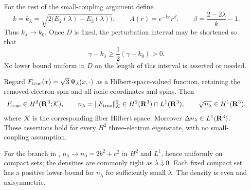 For the rest of the small-coupling argument define
\begin{equation}
 k=k_\lambda=\sqrt{2\bigl(E_2(\lambda)-E_3(\lambda)\bigr)},\qquad
 A(r)=e^{-kr}r^\beta,\qquad
 \beta=\frac{2-2\lambda}{k}-1 .
 \label{eq:ionization-parameters}
\end{equation}
Thus \(k_\lambda\to k_0\).  Once \(D\) is fixed, the perturbation
interval may be shortened so that
\begin{equation}
 \gamma-k_\lambda\ge\frac12(\gamma-k_0)>0 .
 \label{eq:uniform-fast-slow-separation}
\end{equation}
No lower bound uniform in \(D\) on the length of this interval is
asserted or needed.

\begin{lemma}
\label{lem:density-regularity}
Regard
\(F_{\rm true}(x)=\sqrt3\,\Psi_\lambda(x,\cdot)\) as a
Hilbert-space-valued function, retaining the removed-electron spin
and all ionic coordinates and spins.  Then
\[
 F_{\rm true}\in H^2(\mathbf R^3;\mathcal K),\qquad
 n_\lambda=\|F_{\rm true}\|_{\mathcal K}^2
       \in H^2(\mathbf R^3)\cap L^1(\mathbf R^3),\qquad
 \sqrt{n_\lambda}\in H^1(\mathbf R^3),
\]
where \(\mathcal K\) is the corresponding fiber Hilbert space.
Moreover \(\Delta n_\lambda\in L^1(\mathbf R^3)\).
These assertions hold for every \(H^2\) three-electron eigenstate,
with no small-coupling assumption.

For the branch in ,
\(n_\lambda\to n_0=2b^2+e^2\) in \(H^2\) and \(L^1\), hence
uniformly on compact sets; the densities are commonly tight as
\(\lambda\downarrow0\).  Each fixed compact set has a positive
lower bound for \(n_\lambda\) for sufficiently small \(\lambda\).
The density is even and axisymmetric.
\end{lemma}

